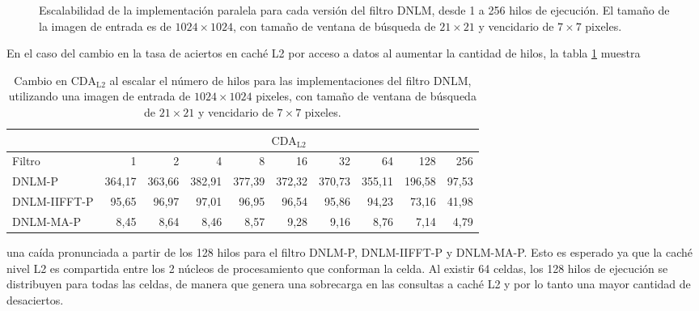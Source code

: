 \begin{figure}[htb]
\centering
  \caption[Escalabilidad de las implementaciones paralelas del filtro DNLM]{Escalabilidad de la implementación paralela para cada versión del filtro DNLM, desde 1 a 256 hilos de ejecución. El tama\~no de la imagen de entrada es de $1024\times1024$, con tama\~no de ventana de búsqueda de $21 \times 21$ y vencidario de $7 \times 7$ pixeles.\label{fig:scalability}}
  \end{figure}
 

En el caso del cambio en la tasa de aciertos en cach\'e L2 por acceso a datos al aumentar la cantidad de hilos, la tabla \ref{tabla:cda_l2} muestra
%
\begin{table}[htb]
\centering
\setlength\tabcolsep{2.5pt}
\setlength{\textfloatsep}{20mm}
\caption[Cambio en la raz\'on de c\'omputo en caché L2 por acceso a datos al escalar el n\'umero de hilos]{Cambio en  $\text{CDA}_\text{L2}$ al escalar el n\'umero de hilos para las implementaciones del filtro DNLM, utilizando una imagen de entrada de $1024 \times 1024$ pixeles, con tama\~no de ventana de búsqueda de $21 \times 21$ y vencidario de $7 \times 7$ pixeles. \label{tabla:cda_l2}}
\begin{tabular}{lrrrrrrrrr}
& \multicolumn{9}{c}{$\text{CDA}_\text{L2}$} \tabularnewline
\hline
 Filtro & 1 & 2 & 4 & 8 & 16 & 32 & 64 & 128 & 256 \tabularnewline
\hline
DNLM-P & 364,17 & 363,66 & 382,91 & 377,39 & 372,32 & 370,73 & 355,11 & 196,58 & 97,53	 \tabularnewline
DNLM-IIFFT-P & 95,65 & 96,97 & 97,01 & 96,95 & 96,54 & 95,86 & 94,23 & 73,16 & 41,98 \tabularnewline
DNLM-MA-P & 8,45 & 8,64 & 8,46 & 8,57 & 9,28 & 9,16 & 8,76 & 7,14 & 4,79 \tabularnewline
\end{tabular}
\end{table}
%
una ca\'ida pronunciada a partir de los 128 hilos para el filtro DNLM-P, DNLM-IIFFT-P y DNLM-MA-P. Esto es esperado ya que la cach\'e nivel L2 es compartida entre los 2 n\'ucleos de procesamiento que conforman la celda. Al existir 64 celdas, los 128 hilos de ejecuci\'on se distribuyen para todas las celdas, de manera que genera una sobrecarga en las consultas a cach\'e L2 y por lo tanto una mayor cantidad de desaciertos.  


